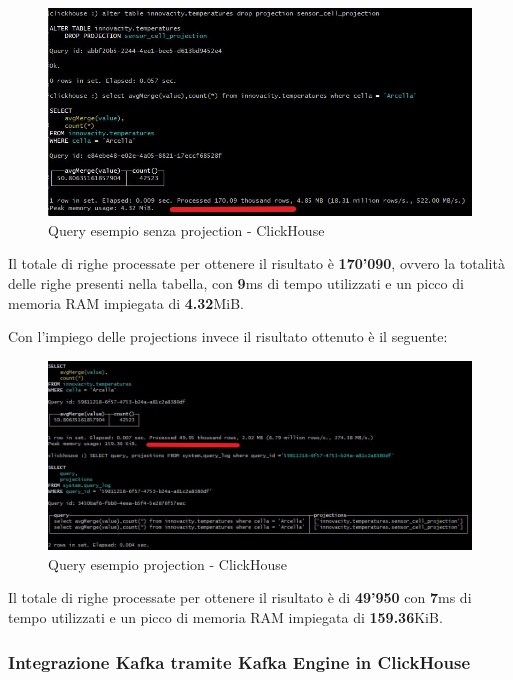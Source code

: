 \begin{figure}[H]
    \centering
    \includegraphics[width=1\textwidth]{../Images/SpecificaTecnica/query2ProjectionsWithout.jpg}
    \caption{Query esempio senza projection - ClickHouse}
    \label{fig:without2proj}
  \end{figure}

Il totale di righe processate per ottenere il risultato è  \textbf{170'090}, ovvero la totalità delle righe presenti nella tabella, con \textbf{9}ms di tempo utilizzati e un picco di memoria RAM impiegata di \textbf{4.32}MiB.

Con l'impiego delle projections invece il risultato ottenuto è il seguente:

\begin{figure}[H]
    \centering
    \includegraphics[width=1\textwidth]{../Images/SpecificaTecnica/query2ProjectionsWith.jpg}
    \caption{Query esempio projection - ClickHouse}
    \label{fig:with2proj}
\end{figure}

Il totale di righe processate per ottenere il risultato è di \textbf{49'950} con \textbf{7}ms di tempo utilizzati e un picco di memoria RAM impiegata di \textbf{159.36}KiB.

\subsubsection{Integrazione Kafka tramite Kafka Engine in ClickHouse}\label{sec:kafka_engine}

